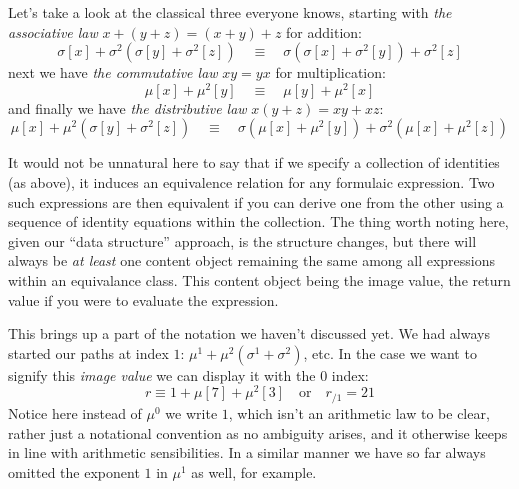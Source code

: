 \documentclass[twoside]{article}
\begin{document}
Let's take a look at the classical three everyone knows, starting with \emph{the associative law} $ x+(y+z)=(x+y)+z $ for addition:
$$ \sigma[x]+\sigma^2(\sigma[y]+\sigma^2[z])\quad\equiv\quad \sigma(\sigma[x]+\sigma^2[y])+\sigma^2[z] $$
next we have \emph{the commutative law} $ xy=yx $ for multiplication:
$$ \mu[x]+\mu^2[y]\quad\equiv\quad \mu[y]+\mu^2[x] $$
and finally we have \emph{the distributive law} $ x(y+z)=xy+xz $:
$$ \mu[x]+\mu^2(\sigma[y]+\sigma^2[z])\quad\equiv\quad \sigma(\mu[x]+\mu^2[y])+\sigma^2(\mu[x]+\mu^2[z]) $$

It would not be unnatural here to say that if we specify a collection of identities (as above), it induces an equivalence relation
for any formulaic expression. Two such expressions are then equivalent if you can derive one from the other using a sequence of
identity equations within the collection. The thing worth noting here, given our ``data structure'' approach, is the structure changes,
but there will always be \emph{at least} one content object remaining the same among all expressions within an equivalance class.
This content object being the image value, the return value if you were to evaluate the expression.

This brings up a part of the notation we haven't discussed yet. We had always started our paths at index $ 1 $:
$ \mu^1+\mu^2(\sigma^1+\sigma^2) $, etc. In the case we want to signify this \emph{image value} we can display
it with the $ 0 $ index:
$$ r\equiv 1+\mu[7]+\mu^2[3]\quad\mbox{or}\quad r_{/1}=21 $$
Notice here instead of $ \mu^0 $ we write $ 1 $, which isn't an arithmetic law to be clear, rather just a notational convention
as no ambiguity arises, and it otherwise keeps in line with arithmetic sensibilities. In a similar manner we have so far always
omitted the exponent $ 1 $ in $ \mu^1 $ as well, for example.
\end{document}

